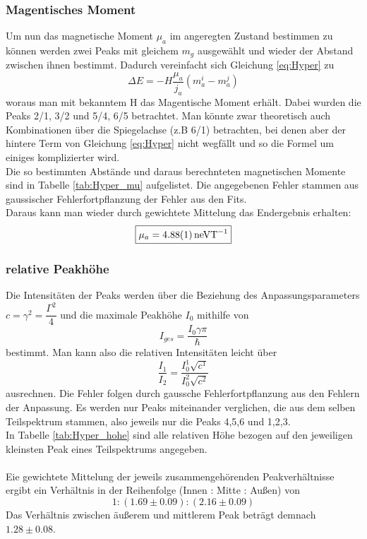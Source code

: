 \documentclass[12pt,a4paper]{article}
\begin{document}
\subsubsection{Magentisches Moment}
Um nun das magnetische Moment $\mu_a$ im angeregten Zustand bestimmen zu können werden zwei Peaks mit gleichem $m_g$ ausgewählt und wieder der Abstand zwischen ihnen bestimmt. Dadurch vereinfacht sich Gleichung \ref{eq:Hyper} zu
\begin{equation}
\Delta E = -H\dfrac{\mu_a}{j_a}(m_{a}^i-m_{a}^j)
\end{equation}
woraus man mit bekanntem H das Magentische Moment erhält. Dabei wurden die Peaks 2/1, 3/2 und 5/4, 6/5 betrachtet. Man könnte zwar theoretisch auch Kombinationen über die Spiegelachse (z.B 6/1) betrachten, bei denen aber der hintere Term von Gleichung \ref{eq:Hyper} nicht wegfällt und so die Formel um einiges komplizierter wird.\\
Die so bestimmten Abstände und daraus berechnteten magnetischen Momente sind in Tabelle \ref{tab:Hyper_mu} aufgelistet. Die angegebenen Fehler stammen aus gaussischer Fehlerfortpflanzung der Fehler aus den Fits.\\
Daraus kann man wieder durch gewichtete Mittelung das Endergebnis erhalten:
\begin{equation*}
\boxed{\mu_a = \SI{4.88\pm 0.01}{neVT^{-1}}}
\end{equation*}

\subsubsection{relative Peakhöhe}

Die Intensitäten der Peaks werden über die Beziehung des Anpassungsparameters $c = \gamma^2 = \dfrac{\Gamma^2}{4}$ und die maximale Peakhöhe $I_0$ mithilfe von
\begin{equation}
I_{ges} = \dfrac{I_0 \gamma \pi}{\hbar}
\end{equation}
bestimmt. Man kann also die relativen Intensitäten leicht über
\begin{equation}
\dfrac{I_1}{I_2} = \dfrac{I_0^1 \sqrt{c^1}}{I_0^2 \sqrt{c^2}}
\end{equation}
ausrechnen. Die Fehler folgen durch gaussche Fehlerfortpflanzung aus den Fehlern der Anpassung. Es werden nur Peaks miteinander verglichen, die aus dem selben Teilspektrum stammen, also jeweils nur die Peaks 4,5,6 und 1,2,3.\\
In Tabelle \ref{tab:Hyper_hohe} sind alle relativen Höhe bezogen auf den jeweiligen kleinsten Peak eines Teilspektrums angegeben.\\
\\
Eie gewichtete Mittelung der jeweils zusammengehörenden Peakverhältnisse ergibt ein Verhältnis in der Reihenfolge (Innen : Mitte : Außen) von
\begin{equation}
\boxed{1:(1.69\pm0.09):(2.16\pm0.09)}
\end{equation}
Das Verhältnis zwischen äußerem und mittlerem Peak beträgt demnach $1.28\pm0.08$.
\end{document}
